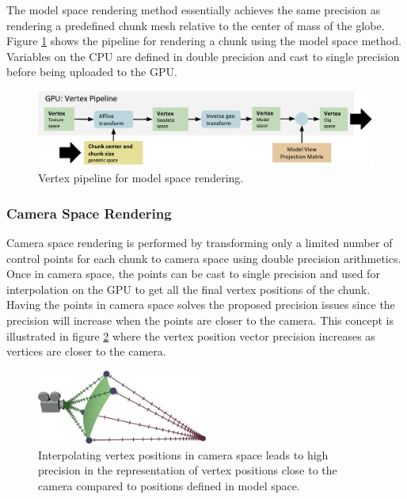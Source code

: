 The model space rendering method essentially achieves the same precision as rendering a predefined chunk mesh relative to the center of mass of the globe. Figure \ref{fig:pipelineglobal} shows the pipeline for rendering a chunk using the model space method. Variables on the CPU are defined in double precision and cast to single precision before being uploaded to the GPU.

\begin{figure}[htbp]
    \centering
    \includegraphics[width=\textwidth]{figures/implementation/rendering/pipeline_global.pdf}
    \caption{Vertex pipeline for model space rendering.}
    \label{fig:pipelineglobal}
\end{figure}

\subsubsection{Camera Space Rendering}

Camera space rendering is performed by transforming only a limited number of control points for each chunk to camera space using double precision arithmetics. Once in camera space, the points can be cast to single precision and used for interpolation on the GPU to get all the final vertex positions of the chunk. Having the points in camera space solves the proposed precision issues since the precision will increase when the points are closer to the camera. This concept is illustrated in figure \ref{fig:local} where the vertex position vector precision increases as vertices are closer to the camera.

\begin{figure}[htbp]
    \centering
    \includegraphics[width=0.5\textwidth]{figures/implementation/rendering/local.pdf}
    \caption{Interpolating vertex positions in camera space leads to high precision in the representation of vertex positions close to the camera compared to positions defined in model space.}
    \label{fig:local}
\end{figure}

